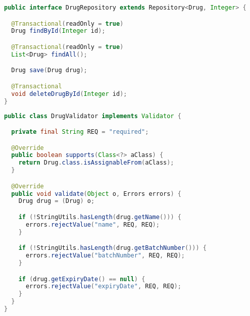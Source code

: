 \documentclass[12pt, a4paper]{article}
\begin{document}
\begin{lstlisting}[language=Java, title='DrugRepository.java']
public interface DrugRepository extends Repository<Drug, Integer> {

  @Transactional(readOnly = true)
  Drug findById(Integer id);

  @Transactional(readOnly = true)
  List<Drug> findAll();

  Drug save(Drug drug);

  @Transactional
  void deleteDrugById(Integer id);
}
\end{lstlisting}

\begin{lstlisting}[language=Java, title='DrugValidator.java']
public class DrugValidator implements Validator {

  private final String REQ = "required";

  @Override
  public boolean supports(Class<?> aClass) {
    return Drug.class.isAssignableFrom(aClass);
  }

  @Override
  public void validate(Object o, Errors errors) {
    Drug drug = (Drug) o;

    if (!StringUtils.hasLength(drug.getName())) {
      errors.rejectValue("name", REQ, REQ);
    }

    if (!StringUtils.hasLength(drug.getBatchNumber())) {
      errors.rejectValue("batchNumber", REQ, REQ);
    }

    if (drug.getExpiryDate() == null) {
      errors.rejectValue("expiryDate", REQ, REQ);
    }
  }
}
\end{lstlisting}
\end{document}
